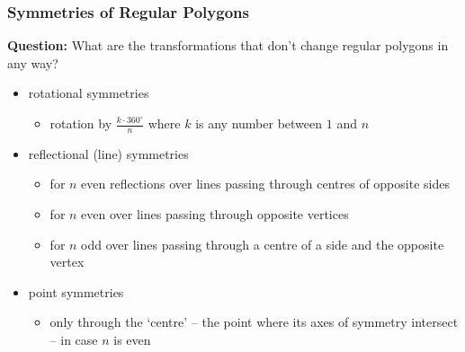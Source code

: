 \documentclass[aspectratio=169,11pt,svgnames,handout]{beamer}
\begin{document}
\begin{frame}
 \frametitle{Symmetries of Regular Polygons}
 \textbf{Question:} What are the transformations that don't change regular
 polygons in any way?
 \pause
 \begin{itemize}[label=\textbullet]
  \item<1-> rotational symmetries
  \begin{itemize}[label=$\circ$]
   \item<2-> rotation by $\frac{k \cdot 360^{ \circ }}{n}$ where $k$ is any
    number between $1$ and $n$
  \end{itemize}
 \item<3-> reflectional (line) symmetries
  \begin{itemize}[label=$\circ$]
   \item<4-> for $n$ even reflections over lines passing through centres of opposite
    sides
   \item<4-> for $n$ even over lines passing through opposite vertices
   \item<4-> for $n$ odd over lines passing through a centre of a side and the
    opposite vertex
  \end{itemize}
 \item<5-> point symmetries
 \begin{itemize}[label=$\circ$]
  \item<6-> only through the `centre' -- the point where its axes of symmetry
   intersect -- in case $n$ is even
 \end{itemize}
 \end{itemize}
\end{frame}
\end{document}
